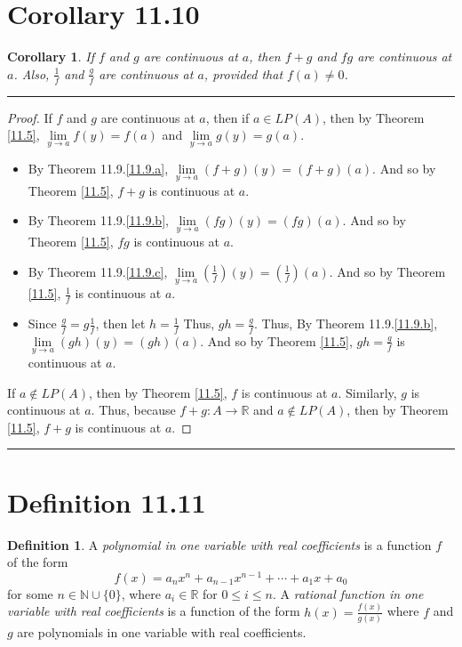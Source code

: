 \documentclass[openany, amssymb, psamsfonts]{amsart}
\newcommand{\bbN}{\mathbb{N}}
\newcommand{\bbR}{\mathbb{R}}
\newcommand{\arr}{\longrightarrow}
\newtheorem{cor}{Corollary}[section]
\theoremstyle{definition}
\newtheorem{defn}{Definition}[section]
\numberwithin{equation}{section}
\begin{document}
\section*{Corollary 11.10}
\begin{cor}
\label{11.10}
	If $f$ and $g$ are continuous at $a$, then $f + g$ and $fg$ are continuous at $a$. Also, $\frac{1}{f}$ and $\frac{g}{f}$ are continuous at $a$, provided that $f(a) \neq 0$.
\end{cor}
\vspace{4pt}     \hrule   \vspace{4pt} \begin{proof}
If $f$ and $g$ are continuous at $a$, then if $a\in LP(A)$, then by Theorem \ref{11.5}, $\lim\limits_{y\to a}f(y) = f(a)$ and $\lim\limits_{y\to a}g(y) = g(a)$. 
\begin{itemize}
    \item By Theorem 11.9.\ref{11.9.a}, $\lim\limits_{y\to a}(f+g)(y) = (f+g)(a)$. And so by Theorem \ref{11.5}, $f+g$ is continuous at $a$. 
    \item By Theorem 11.9.\ref{11.9.b}, $\lim\limits_{y\to a}(fg)(y) = (fg)(a)$. And so by Theorem \ref{11.5}, $fg$ is continuous at $a$.
    \item By Theorem 11.9.\ref{11.9.c}, $\lim\limits_{y\to a}(\frac{1}{f})(y) = (\frac{1}{f})(a)$. And so by Theorem \ref{11.5}, $\frac{1}{f}$ is continuous at $a$.
    \item Since $\frac{g}{f} = g\frac{1}{f}$, then let $h = \frac{1}{f}$ Thus, $gh = \frac{g}{f}$. Thus,  By Theorem 11.9.\ref{11.9.b}, $\lim\limits_{y\to a}(gh)(y) = (gh)(a)$. And so by Theorem \ref{11.5}, $gh = \frac{g}{f}$ is continuous at $a$.
\end{itemize}
If $a\notin LP(A)$, then by Theorem \ref{11.5}, $f$ is continuous at $a$. Similarly, $g$ is continuous at $a$. Thus, because $f+g\colon A \arr \bbR$ and $a\notin LP(A)$, then by Theorem \ref{11.5}, $f+g$ is continuous at $a$.
\end{proof} \vspace{4pt}     \hrule   \vspace{4pt}

\section*{Definition 11.11}
\begin{defn}
	A \emph{polynomial in one variable with real coefficients} is a function $f$ of the form 
	\[
		f(x) = a_n x^n+a_{n-1}x^{n-1}+\cdots+a_1 x+a_0
	\]
	for some $n \in \bbN \cup \{0\}$, where $a_i \in \bbR$ for $0\leq i\leq n$. A \emph{rational function in one variable with real coefficients} is a function of the form $h(x) = \frac{f(x)}{g(x)}$ where $f$ and $g$ are polynomials in one variable with real coefficients.
\end{defn}
\end{document}
